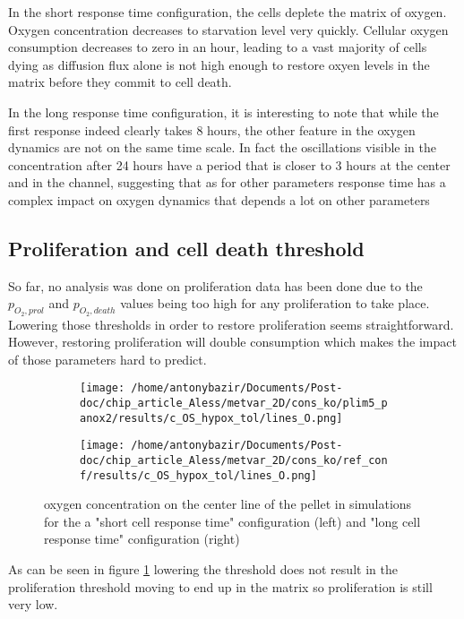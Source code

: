 \documentclass[11pt,a4paper]{article}
\begin{document}
In the short response time configuration, the cells deplete the matrix of oxygen. Oxygen concentration decreases to starvation level very quickly.  Cellular oxygen consumption decreases to zero in an hour, leading to a vast majority of cells dying as diffusion flux alone is not high enough to restore oxyen levels in the matrix before they commit to cell death.

In the long response time configuration, it is interesting to note that while the first response indeed clearly takes 8 hours, the other feature in the oxygen dynamics are not on the same time scale. In fact the oscillations visible in the concentration after 24 hours have a period that is closer to 3 hours at the center and in the channel, suggesting that as for other parameters response time has a complex impact on oxygen dynamics that depends a lot on other parameters

\subsection{Proliferation and cell death threshold}
So far, no analysis was done on proliferation data has been done due to the $p_{O_2,prol}$ and $p_{O_2,death}$ values being too high for any proliferation to take place. Lowering those thresholds in order to restore proliferation seems straightforward. However, restoring proliferation will double consumption which makes the impact of those parameters hard to predict.   

\begin{figure}[ht!]
\begin{subfigure}{0.44\textwidth}
	\centering
	\texttt{[image: /home/antonybazir/Documents/Post-doc/chip\_article\_Aless/metvar\_2D/cons\_ko/plim5\_panox2/results/c\_OS\_hypox\_tol/lines\_O.png]}
\end{subfigure}
\begin{subfigure}{0.44\textwidth}
	\centering
	\texttt{[image: /home/antonybazir/Documents/Post-doc/chip\_article\_Aless/metvar\_2D/cons\_ko/ref\_conf/results/c\_OS\_hypox\_tol/lines\_O.png]}
\end{subfigure}
\caption{oxygen concentration on the center line of the pellet in simulations for the a "short cell response time" configuration (left) and "long cell response time" configuration (right)  \label{thres_map}}
\end{figure}

As can be seen in figure \ref{thres_map} lowering the threshold does not result in the proliferation threshold moving to end up in the matrix so proliferation is still very low.
\end{document}
